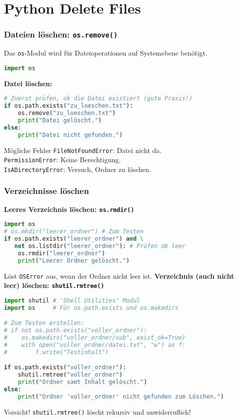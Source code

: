 \documentclass[aspectratio=169]{beamer} %
\begin{document}
\section{Python Delete Files}

\begin{frame}[fragile]
\frametitle{Dateien löschen: \texttt{os.remove()}}
Das \texttt{os}-Modul wird für Dateioperationen auf Systemebene benötigt.
\begin{lstlisting}[language=Python]
import os
\end{lstlisting}
\textbf{Datei löschen:}
\begin{lstlisting}[language=Python]
# Zuerst prüfen, ob die Datei existiert (gute Praxis!)
if os.path.exists("zu_loeschen.txt"):
    os.remove("zu_loeschen.txt")
    print("Datei gelöscht.")
else:
    print("Datei nicht gefunden.")
\end{lstlisting}
\begin{block}{Mögliche Fehler}
    \texttt{FileNotFoundError}: Datei nicht da. \\
    \texttt{PermissionError}: Keine Berechtigung. \\
    \texttt{IsADirectoryError}: Versuch, Ordner zu löschen.
\end{block}
\end{frame}

\begin{frame}[fragile]
\frametitle{Verzeichnisse löschen}
\textbf{Leeres Verzeichnis löschen: \texttt{os.rmdir()}}
\begin{lstlisting}[language=Python]
import os
# os.mkdir("leerer_ordner") # Zum Testen
if os.path.exists("leerer_ordner") and \
   not os.listdir("leerer_ordner"): # Prüfen ob leer
    os.rmdir("leerer_ordner")
    print("Leerer Ordner gelöscht.")
\end{lstlisting}
Löst \texttt{OSError} aus, wenn der Ordner nicht leer ist.
\vspace{0.5em}
\textbf{Verzeichnis (auch nicht leer) löschen: \texttt{shutil.rmtree()}}
\begin{lstlisting}[language=Python]
import shutil # 'Shell Utilities' Modul
import os     # Für os.path.exists und os.makedirs

# Zum Testen erstellen:
# if not os.path.exists("voller_ordner"):
#    os.makedirs("voller_ordner/sub", exist_ok=True)
#    with open("voller_ordner/datei.txt", "w") as f:
#        f.write("Testinhalt")

if os.path.exists("voller_ordner"):
    shutil.rmtree("voller_ordner")
    print("Ordner samt Inhalt gelöscht.")
else:
    print("Ordner 'voller_ordner' nicht gefunden zum Löschen.")
\end{lstlisting}
\begin{alertblock}{Vorsicht!}
\texttt{shutil.rmtree()} löscht rekursiv und unwiderruflich!
\end{alertblock}
\end{frame}
\end{document}
